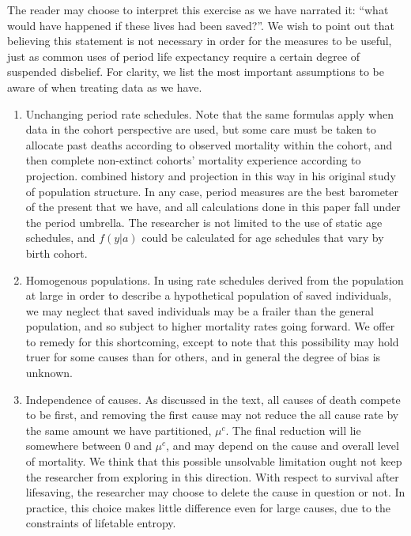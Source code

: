 \documentclass{article}
\begin{document}
The reader may choose to interpret this exercise as we
have narrated it: ``what would have happened if these lives had been saved?''. We wish to point out that believing
this statement is not necessary in order for the measures to be useful, just as common uses of
period life expectancy require a certain degree of suspended disbelief. For
clarity, we list the most important assumptions to be aware of when treating
data as we have.
\begin{enumerate}
\item Unchanging period rate schedules. Note that the same formulas apply when
data in the cohort perspective are used, but some care must be taken to allocate past deaths according to observed mortality within the cohort, and then complete non-extinct
cohorts' mortality experience according to
projection. \citet{brouard1986structure} combined history and projection
in this way in his original study of population structure.  In any case, period measures are the best barometer of the
present that we have, and all calculations done in this paper fall under the
period umbrella. The researcher is not limited to the use of static age
schedules, and $f(y|a)$ could be calculated for age schedules that vary
by birth cohort.
\item Homogenous populations. In using rate schedules derived from the
population at large in order to describe a hypothetical population of saved
individuals, we may neglect that saved individuals may be a frailer than the
general population, and so subject to higher mortality rates going forward. We
offer to remedy for this shortcoming, except to note that this possibility may
hold truer for some causes than for others, and in general the degree of bias is
unknown.
\item Independence of causes. As discussed in the text, all causes of death
compete to be first, and removing the first cause may not reduce the all cause
rate by the same amount we have partitioned, $\mu^c$. The final reduction will
lie somewhere between 0 and $\mu^c$, and may depend on the cause and
overall level of mortality. We think that this possible unsolvable limitation
ought not keep the researcher from exploring in this direction. With respect to
survival after lifesaving, the researcher may choose to delete the cause in
question or not. In practice, this choice makes little difference even for
large causes, due to the constraints of lifetable entropy.
\end{enumerate}
\end{document}
